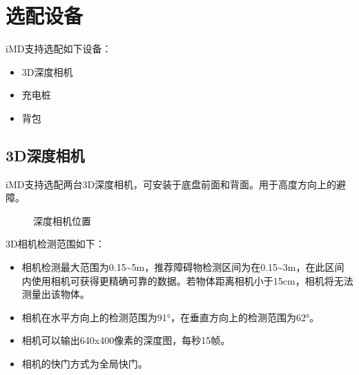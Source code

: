 \documentclass[a4paper,11pt,english,openany,oneside]{sphinxmanual}
\begin{document}
\sphinxstepscope


\chapter{选配设备}
\label{\detokenize{_u9009_u914d_u8bbe_u5907:id1}}\label{\detokenize{_u9009_u914d_u8bbe_u5907:id2}}\label{\detokenize{_u9009_u914d_u8bbe_u5907::doc}}
\sphinxAtStartPar
iM\sphinxhyphen{}D支持选配如下设备：
\begin{itemize}
\item {} 
\sphinxAtStartPar
3D深度相机

\item {} 
\sphinxAtStartPar
充电桩

\item {} 
\sphinxAtStartPar
背包

\end{itemize}


\section{3D深度相机}
\label{\detokenize{_u9009_u914d_u8bbe_u5907:d}}\label{\detokenize{_u9009_u914d_u8bbe_u5907:id3}}
\sphinxAtStartPar
iM\sphinxhyphen{}D支持选配两台3D深度相机，可安装于底盘前面和背面。用于高度方向上的避障。

\begin{figure}[H]
\centering
\capstart

\noindent{}
\caption{深度相机位置}\label{\detokenize{_u9009_u914d_u8bbe_u5907:id30}}\end{figure}

\sphinxAtStartPar
3D相机检测范围如下：
\begin{itemize}
\item {} 
\sphinxAtStartPar
相机检测最大范围为0.15\textasciitilde{}5m，推荐障碍物检测区间为在0.15\textasciitilde{}3m，在此区间内使用相机可获得更精确可靠的数据。若物体距离相机小于15cm，相机将无法测量出该物体。

\item {} 
\sphinxAtStartPar
相机在水平方向上的检测范围为91°，在垂直方向上的检测范围为62°。

\item {} 
\sphinxAtStartPar
相机可以输出640x400像素的深度图，每秒15帧。

\item {} 
\sphinxAtStartPar
相机的快门方式为全局快门。

\end{itemize}
\end{document}
